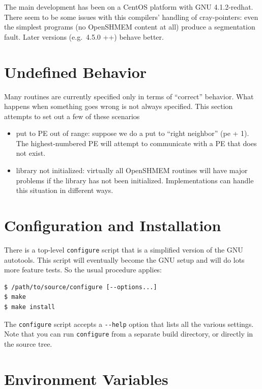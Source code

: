 \documentclass[english]{article}
\begin{document}
The main development has been on a CentOS platform with GNU
4.1.2-redhat.  There seem to be some issues with this compilers'
handling of cray-pointers: even the simplest programs (no OpenSHMEM
content at all) produce a segmentation fault. Later versions
(e.g.\ 4.5.0 ++) behave better.

\section{Undefined Behavior}

Many routines are currently specified only in terms of ``correct''
behavior. What happens when something goes wrong is not always
specified.  This section attempts to set out a few of these scenarios
\begin{itemize}
\item put to PE out of range: suppose we do a put to ``right
neighbor'' (pe + 1). The highest-numbered PE will attempt to
communicate with a PE that does not exist.
\item library not initialized: virtually all OpenSHMEM routines will
have major problems if the library has not been
initialized. Implementations can handle this situation in different
ways.
\end{itemize}

\section{Configuration and Installation}

There is a top-level \texttt{configure} script that is a simplified
version of the GNU autotools. This script will eventually become the
GNU setup and will do lots more feature tests. So the usual procedure
applies:

\begin{lstlisting}
$ /path/to/source/configure [--options...]
$ make
$ make install
\end{lstlisting}

The \texttt{configure} script accepts a
\texttt{-{}-help} option that lists all the various settings.  Note
that you can run \texttt{configure} from a separate build directory,
or directly in the source tree.

\section{Environment Variables\label{sec:Environment-Variables}}
\end{document}
